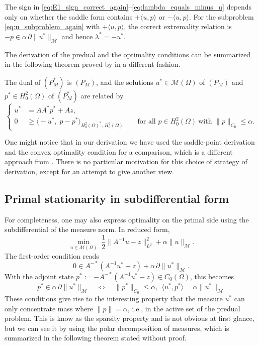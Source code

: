 \documentclass[11pt,a4paper]{article}
\begin{document}
\begin{remark}
The sign in \eqref{eq:E1_sign_correct_again}--\eqref{eq:lambda_equals_minus_u} depends only on whether the saddle
form contains $+\langle u,p\rangle$ or $-\langle u,p\rangle$.
For the subproblem \eqref{eq:u_subproblem_again} with $+\langle u,p\rangle$, the correct extremality relation is
$-p\in \alpha\,\partial\|u^*\|_{\mathcal{M}}$ and hence $\lambda^*=-u^*$.    
\end{remark}

The derivation of the predual and the optimality conditions can be summarized in the following theorem proved by \cite{ClasonKunisch2009} in a different fashion.
\begin{theorem}\label{thm:clason_thm_2_4}
The dual of $(P_M^\ast)$ is $(P_M)$, and the solutions $u^\ast\in \mathcal{M}(\Omega)$ of $(P_M)$ and
$p^\ast\in H_0^2(\Omega)$ of $(P_M^\ast)$ are related by
\begin{equation}\label{eq:clason_2_4}
\left\{
\begin{aligned}
u^\ast &= AA^\ast p^\ast + Az,\\
0 &\ge \bigl\langle -u^\ast,\; p - p^\ast \bigr\rangle_{H_0^2(\Omega)^\ast,\,H_0^2(\Omega)}
\qquad \text{for all } p\in H_0^2(\Omega)\ \text{with }\|p\|_{C_0}\le \alpha.
\end{aligned}
\right.
\end{equation}
\end{theorem}

\begin{remark}
      One might notice that in our derivation we have used the saddle-point derivation and the convex optimality condition for a comparison, which is a different approach from \cite{ClasonKunisch2009}. There is no particular motivation for this choice of strategy of derivation, except for an attempt to give another view.
\end{remark}

\subsection{Primal stationarity in subdifferential form}
For completeness, one may also express optimality on the primal side using the subdifferential of the
measure norm. In reduced form,
\[
\min_{u\in\mathcal{M}(\Omega)}\;
\frac12\|A^{-1}u-z\|_{L^2}^2+\alpha\|u\|_{\mathcal{M}}.
\]
The first-order condition reads
\[
0 \in A^{-*}(A^{-1}u^*-z)+\alpha\,\partial\|u^*\|_{\mathcal{M}}.
\]
With the adjoint state $p^*:=-A^{-*}(A^{-1}u^*-z)\in C_0(\Omega)$, this becomes
\[
p^*\in \alpha\,\partial\|u^*\|_{\mathcal{M}}
\quad\Longleftrightarrow\quad
\|p^*\|_{C_0}\le \alpha,\ \ \langle u^*,p^*\rangle=\alpha\|u^*\|_{\mathcal{M}}\label{eq:first_order_primal}
\]
These conditions give rise to the interesting property that the measure $u^*$ can only concentrate mass where $\|p\| = \alpha$, i.e., in the active set of the predual problem. This is know as the sparsity property and is not obvious at first glance, but we can see it by using the polar decomposition of measures, which is summarized in the following theorem stated without proof.   
\end{document}
